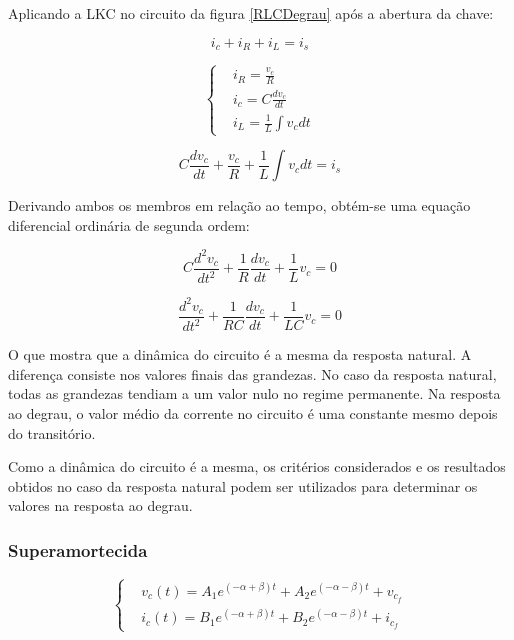 \documentclass[12pt,fleqn]{book} %
\begin{document}
{Aplicando a LKC no circuito da figura \ref{RLCDegrau} após a abertura da chave:

\begin{equation}
i_c + i_R + i_L = i_s
\end{equation}

\begin{equation}
\left\{\begin{aligned} & 
        i_R = \frac{v_c}{R}\\& 
        i_c = C\frac{dv_c}{dt}\\&        
        i_L = \frac{1}{L}\int v_cdt
    \end{aligned}\right.
\end{equation}

\begin{equation}
C\frac{dv_c}{dt} + \frac{v_c}{R} + \frac{1}{L}\int v_cdt = i_s
\end{equation}

Derivando ambos os membros em relação ao tempo, obtém-se uma equação diferencial ordinária de segunda ordem:

\begin{equation}
C\frac{d^2v_c}{dt^2} + \frac{1}{R}\frac{dv_c}{dt} + \frac{1}{L} v_c = 0
\end{equation}

\begin{equation}
\frac{d^2v_c}{dt^2} + \frac{1}{RC}\frac{dv_c}{dt} + \frac{1}{LC} v_c = 0
\end{equation}   

O que mostra que a dinâmica do circuito é a mesma da resposta natural. A diferença consiste nos valores finais das grandezas. No caso da resposta natural, todas as grandezas tendiam a um valor nulo no regime permanente. Na resposta ao degrau, o valor médio da corrente no circuito é uma constante mesmo depois do transitório.

Como a dinâmica do circuito é a mesma, os critérios considerados e os resultados obtidos no caso da resposta natural podem ser utilizados para determinar os valores na resposta ao degrau.
        
            \subsubsection{Superamortecida}
            
\begin{equation}
\left\{\begin{aligned} & 
        v_c(t) = A_1e^{(-\alpha + \beta)t} + A_2e^{(-\alpha - \beta)t} + v_{c_f}\\&       
        i_c(t) = B_1e^{(-\alpha + \beta)t} + B_2e^{(-\alpha - \beta)t} + i_{c_f}
    \end{aligned}\right.
\end{equation}

}
\end{document}
